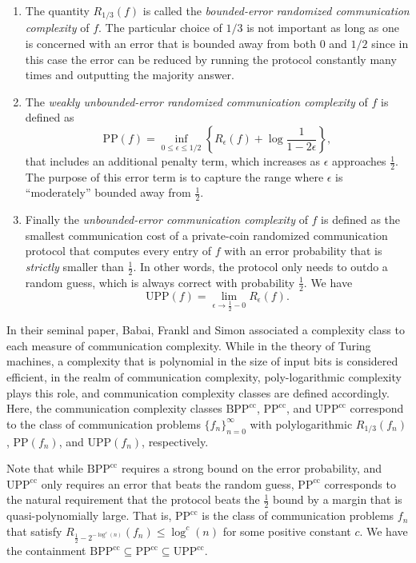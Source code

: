 \documentclass[11pt]{article}
\numberwithin{equation}{section}
\theoremstyle{definition}
\theoremstyle{plain}
\theoremstyle{definition}\newtheorem{problem}[theorem]{Problem}\theoremstyle{plain}
\newcommand{\BPP}{\mathrm{BPP}}
\newcommand{\UPP}{\mathrm{UPP}}
\newcommand{\calPP}{\mathrm{PP}}
\newcommand{\cc}{\mathrm{cc}}
\begin{document}
\begin{enumerate}
\item The quantity $R_{1/3}(f)$ is called the \emph{bounded-error  randomized communication complexity} of $f$.  The particular choice of $1/3$  is not important as long as one is concerned with an error that is bounded away from both $0$ and $1/2$ since in this case the error  can be reduced   by running the protocol constantly many times and outputting the majority answer.

\item The \emph{weakly unbounded-error  randomized communication complexity} of $f$ is defined as
$$\calPP(f) =  \inf_{0 \le \epsilon \le 1/2} \left\{R_\epsilon(f) +  \log  \frac{1}{1-2 \epsilon}  \right\}, $$
that includes an additional penalty term, which increases as $\epsilon$ approaches $\frac{1}{2}$. The purpose of this error term is to capture the range where $\epsilon$ is ``moderately'' bounded away from $\frac{1}{2}$.

\item Finally the \emph{unbounded-error communication complexity} of $f$ is defined as the smallest communication cost of a  private-coin randomized communication protocol that   computes every entry of $f$   with an error probability that is \emph{strictly} smaller than $\frac{1}{2}$. In other words,   the protocol only needs to  outdo a random guess, which is always correct with  probability $\frac{1}{2}$. We have
%
%
%
$$\UPP(f)=\lim_{\epsilon \to \frac{1}{2}-0} R_\epsilon(f).$$
%
\end{enumerate}

In their seminal paper, Babai, Frankl and Simon \cite{babai1986complexity} associated a   complexity class to each measure of communication complexity. While in the theory of Turing machines, a  complexity that is polynomial in the size of input bits is considered efficient, in the realm of communication complexity, poly-logarithmic complexity plays this role, and communication complexity classes are defined accordingly.  Here, the communication complexity classes $\BPP^\cc$, $\calPP^\cc$, and  $\UPP^\cc$  correspond to the class of communication problems $\{f_n\}_{n=0}^\infty$ with  polylogarithmic  $R_{1/3}(f_n)$, $\calPP(f_n)$, and $\UPP(f_n)$, respectively.

Note that while $\BPP^\cc$ requires a strong bound on the error probability, and $\UPP^\cc$ only requires an error that beats  the random guess, $\calPP^\cc$  corresponds to the natural requirement that the  protocol  beats the $\frac{1}{2}$ bound by a margin that is quasi-polynomially large.  That is, $\calPP^\cc$  is  the class of communication problems $f_n$ that satisfy $R_{\frac{1}{2}-2^{-\log^c(n)}}(f_n) \le \log^c(n)$ for some positive constant $c$.  We have the containment $\BPP^\cc \subseteq \calPP^\cc \subseteq \UPP^\cc$.
\end{document}

